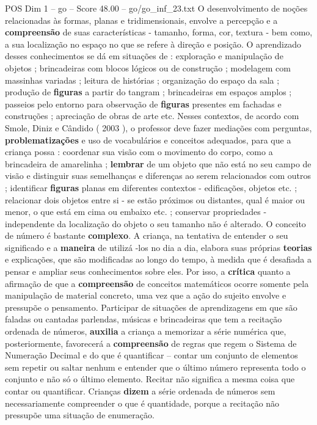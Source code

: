 \begin{textsample}{POS Dim 1 – go – Score 48.00 – go/go\_inf\_23.txt}
O desenvolvimento de noções relacionadas às formas, planas e tridimensionais, envolve a percepção e a \textbf{compreensão} de suas características - tamanho, forma, cor, textura - bem como, a sua localização no espaço no que se refere à direção e posição.
O aprendizado desses conhecimentos se dá em situações de : exploração e manipulação de objetos ; brincadeiras com blocos lógicos ou de construção ; modelagem com massinhas variadas ; leitura de histórias ; organização do espaço da sala ; produção de \textbf{figuras} a partir do tangram ; brincadeiras em espaços amplos ; passeios pelo entorno para observação de \textbf{figuras} presentes em fachadas e construções ; apreciação de obras de arte etc.
Nesses contextos, de acordo com Smole, Diniz e Cândido ( 2003 ), o professor deve fazer mediações com perguntas, \textbf{problematizações} e uso de vocabulários e conceitos adequados, para que a criança possa : coordenar sua visão com o movimento do corpo, como a brincadeira de amarelinha ; \textbf{lembrar} de um objeto que não está no seu campo de visão e distinguir suas semelhanças e diferenças ao serem relacionados com outros ; identificar \textbf{figuras} planas em diferentes contextos - edificações, objetos etc. ; relacionar dois objetos entre si - se estão próximos ou distantes, qual é maior ou menor, o que está em cima ou embaixo etc. ; conservar propriedades - independente da localização do objeto o seu tamanho não é alterado.
O conceito de número é bastante \textbf{complexo}.
A criança, na tentativa de entender o seu significado e a \textbf{maneira} de utilizá -los no dia a dia, elabora suas próprias \textbf{teorias} e explicações, que são modificadas ao longo do tempo, à medida que é desafiada a pensar e ampliar seus conhecimentos sobre eles.
Por isso, a \textbf{crítica} quanto a afirmação de que a \textbf{compreensão} de conceitos matemáticos ocorre somente pela manipulação de material concreto, uma vez que a ação do sujeito envolve e pressupõe o pensamento.
Participar de situações de aprendizagens em que são faladas ou cantadas parlendas, músicas e brincadeiras que tem a recitação ordenada de números, \textbf{auxilia} a criança a memorizar a série numérica que, posteriormente, favorecerá a \textbf{compreensão} de regras que regem o Sistema de Numeração Decimal e do que é quantificar – contar um conjunto de elementos sem repetir ou saltar nenhum e entender que o último número representa todo o conjunto e não só o último elemento.
Recitar não significa a mesma coisa que contar ou quantificar.
Crianças \textbf{dizem} a série ordenada de números sem necessariamente compreender o que é quantidade, porque a recitação não pressupõe uma situação de enumeração.

\end{textsample}
